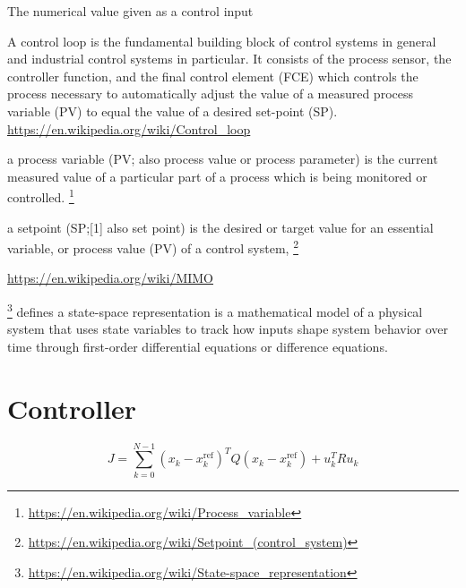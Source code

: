 \documentclass{book}
\providecommand{\seeherefooter}[1]{\footnote{\url{#1}}}
\providecommand{\clickurlfooter}[1]{\footnote{\url{#1}}}
\begin{document}
%


The numerical value given as a control input


A control loop is the fundamental building block of control systems in general and industrial control systems in particular. It consists of the process sensor, the controller function, and the final control element (FCE) which controls the process necessary to automatically adjust the value of a measured process variable (PV) to equal the value of a desired set-point (SP).
    \url{https://en.wikipedia.org/wiki/Control_loop}


a process variable (PV; also process value or process parameter) is the current measured value of a particular part of a process which is being monitored or controlled. \seeherefooter{https://en.wikipedia.org/wiki/Process_variable}


a setpoint (SP;[1] also set point) is the desired or target value for an essential variable, or process value (PV) of a control system, \seeherefooter{https://en.wikipedia.org/wiki/Setpoint_(control_system)}


\url{https://en.wikipedia.org/wiki/MIMO}


\clickurlfooter{https://en.wikipedia.org/wiki/State-space_representation} defines a state-space representation is a mathematical model of a physical system that uses state variables to track how inputs shape system behavior over time through first-order differential equations or difference equations. 

\section{Controller}


\[
        J = \sum_{k=0}^{N-1}
        \left( x_k - x_k^{\mathrm{ref}} \right)^T
        Q
        \left( x_k - x_k^{\mathrm{ref}} \right)
        +
        u_k^T R u_k
    \]
    
\end{document}
